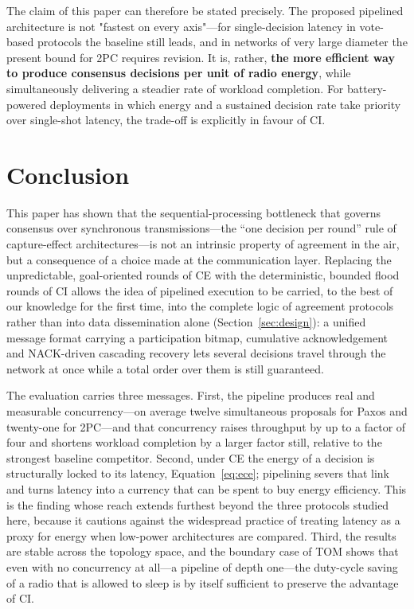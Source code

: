 \documentclass[journal]{IEEEtran}
\newcommand{\CI}{CI}                      %
\newcommand{\CE}{CE}                      %
\begin{document}
The claim of this paper can therefore be stated precisely. The proposed
pipelined architecture is not "fastest on every axis"---for single-decision
latency in vote-based protocols the baseline still leads, and in networks
of very large diameter the present bound for 2PC requires revision. It is,
rather, \textbf{the more efficient way to produce consensus decisions per
unit of radio energy}, while simultaneously delivering a steadier rate of
workload completion. For battery-powered deployments in which energy and a
sustained decision rate take priority over single-shot latency, the
trade-off is explicitly in favour of \CI.


\section{Conclusion}
\label{sec:conclusion}

This paper has shown that the sequential-processing bottleneck that
governs consensus over synchronous transmissions---the ``one decision per
round'' rule of capture-effect architectures---is not an intrinsic
property of agreement in the air, but a consequence of a choice made at
the communication layer. Replacing the unpredictable, goal-oriented
rounds of \CE{} with the deterministic, bounded flood rounds of \CI{}
allows the idea of pipelined execution to be carried, to the best of our
knowledge for the first time, into the complete logic of agreement
protocols rather than into data dissemination alone
(Section~\ref{sec:design}): a unified message format carrying a
participation bitmap, cumulative acknowledgement and NACK-driven
cascading recovery lets several decisions travel through the network at
once while a total order over them is still guaranteed.

The evaluation carries three messages. First, the pipeline produces real
and measurable concurrency---on average twelve simultaneous proposals for
Paxos and twenty-one for 2PC---and that concurrency raises throughput by up to
a factor of four and shortens workload completion by a larger factor
still, relative to the strongest baseline competitor. Second, under \CE{}
the energy of a decision is structurally locked to its latency,
Equation~\eqref{eq:ece}; pipelining severs that link and turns latency
into a currency that can be spent to buy energy efficiency. This is the
finding whose reach extends furthest beyond the three protocols studied
here, because it cautions against the widespread practice of treating
latency as a proxy for energy when low-power architectures are compared.
Third, the results are stable across the topology space, and the boundary
case of TOM shows that even with no concurrency at all---a pipeline of
depth one---the duty-cycle saving of a radio that is allowed to sleep is
by itself sufficient to preserve the advantage of \CI{}.
\end{document}
